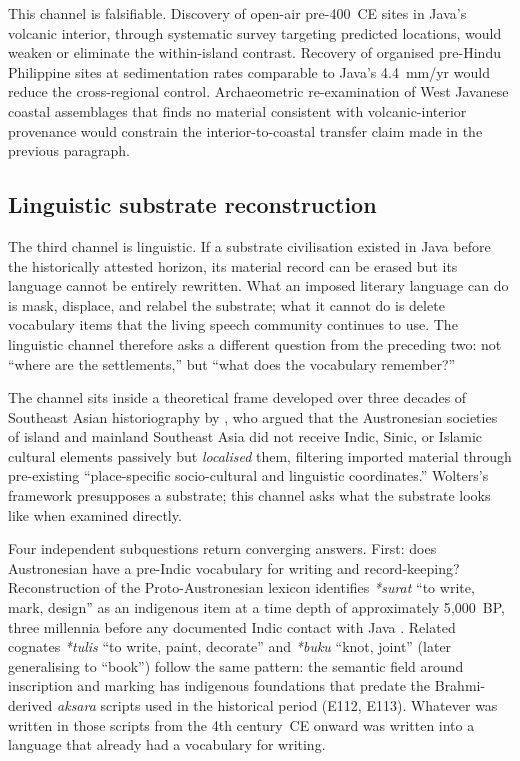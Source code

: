 \documentclass[12pt,a4paper]{article}
\begin{document}
This channel is falsifiable. Discovery of open-air pre-400~CE sites in Java's volcanic interior, through systematic survey targeting predicted locations, would weaken or eliminate the within-island contrast. Recovery of organised pre-Hindu Philippine sites at sedimentation rates comparable to Java's 4.4~mm/yr would reduce the cross-regional control. Archaeometric re-examination of West Javanese coastal assemblages that finds no material consistent with volcanic-interior provenance would constrain the interior-to-coastal transfer claim made in the previous paragraph.


\subsection{Linguistic substrate reconstruction}
\label{sec:ch3}

The third channel is linguistic. If a substrate civilisation existed in Java before the historically attested horizon, its material record can be erased but its language cannot be entirely rewritten. What an imposed literary language can do is mask, displace, and relabel the substrate; what it cannot do is delete vocabulary items that the living speech community continues to use. The linguistic channel therefore asks a different question from the preceding two: not ``where are the settlements,'' but ``what does the vocabulary remember?''

The channel sits inside a theoretical frame developed over three decades of Southeast Asian historiography by \citet{wolters1999}, who argued that the Austronesian societies of island and mainland Southeast Asia did not receive Indic, Sinic, or Islamic cultural elements passively but \textit{localised} them, filtering imported material through pre-existing ``place-specific socio-cultural and linguistic coordinates.'' Wolters's framework presupposes a substrate; this channel asks what the substrate looks like when examined directly.

Four independent subquestions return converging answers. First: does Austronesian have a pre-Indic vocabulary for writing and record-keeping? Reconstruction of the Proto-Austronesian lexicon identifies \textit{*surat} ``to write, mark, design'' as an indigenous item at a time depth of approximately 5{,}000~BP, three millennia before any documented Indic contact with Java \citep{blust2009acd}. Related cognates \textit{*tulis} ``to write, paint, decorate'' and \textit{*buku} ``knot, joint'' (later generalising to ``book'') follow the same pattern: the semantic field around inscription and marking has indigenous foundations that predate the Brahmi-derived \textit{aksara} scripts used in the historical period (E112, E113). Whatever was written in those scripts from the 4th century~CE onward was written into a language that already had a vocabulary for writing.
\end{document}
